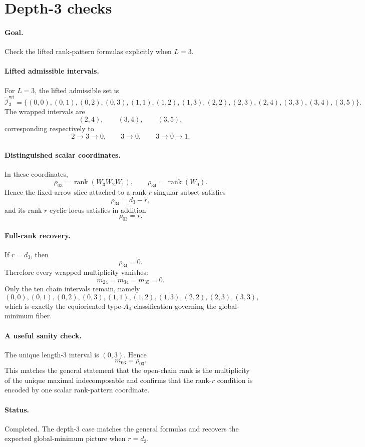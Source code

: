 \section*{Depth-3 checks}

\paragraph{Goal.}
Check the lifted rank-pattern formulas explicitly when \(L=3\).

\paragraph{Lifted admissible intervals.}
For \(L=3\), the lifted admissible set is
\[
\widetilde{\mathcal I}_3^{\mathrm{wt}}
=
\{(0,0),(0,1),(0,2),(0,3),
(1,1),(1,2),(1,3),
(2,2),(2,3),(2,4),
(3,3),(3,4),(3,5)\}.
\]
The wrapped intervals are
\[
(2,4),\qquad (3,4),\qquad (3,5),
\]
corresponding respectively to
\[
2\to 3\to 0,\qquad 3\to 0,\qquad 3\to 0\to 1.
\]

\paragraph{Distinguished scalar coordinates.}
In these coordinates,
\[
\rho_{03}=\operatorname{rank}(W_3W_2W_1),
\qquad
\rho_{34}=\operatorname{rank}(W_0).
\]
Hence the fixed-arrow slice attached to a rank-\(r\) singular subset satisfies
\[
\rho_{34}=d_3-r,
\]
and its rank-\(r\) cyclic locus satisfies in addition
\[
\rho_{03}=r.
\]

\paragraph{Full-rank recovery.}
If \(r=d_3\), then
\[
\rho_{34}=0.
\]
Therefore every wrapped multiplicity vanishes:
\[
m_{24}=m_{34}=m_{35}=0.
\]
Only the ten chain intervals remain, namely
\[
(0,0),(0,1),(0,2),(0,3),(1,1),(1,2),(1,3),(2,2),(2,3),(3,3),
\]
which is exactly the equioriented type-\(A_4\) classification governing the
global-minimum fiber.

\paragraph{A useful sanity check.}
The unique length-\(3\) interval is \((0,3)\). Hence
\[
m_{03}=\rho_{03}.
\]
This matches the general statement that the open-chain rank is the multiplicity
of the unique maximal indecomposable and confirms that the rank-\(r\) condition
is encoded by one scalar rank-pattern coordinate.

\paragraph{Status.}
Completed. The depth-3 case matches the general formulas and recovers the
expected global-minimum picture when \(r=d_3\).
